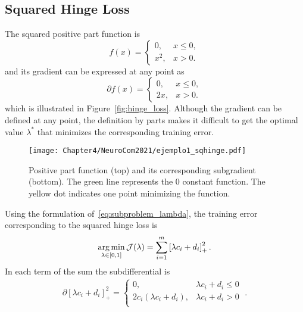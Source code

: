 \subsection{Squared Hinge Loss}
The squared positive part function is
\begin{equation}
    \nonumber
    f(x) = 
    \begin{cases}
    0 ,& x \leq 0, \\
    x^2 ,& x > 0    .
    \end{cases}
\end{equation}
and its gradient can be expressed at any point as
\begin{equation}
    \nonumber
    \partial f(x) = 
    \begin{cases}
    0 ,& x \leq 0, \\
    2x ,& x > 0 .
    \end{cases}
\end{equation}
which is illustrated in Figure~\ref{fig:hinge_loss}.
Although the gradient can be defined at any point, the definition by parts makes it difficult to get the optimal value $\lambda^*$ that minimizes the corresponding training error.
\begin{figure}[t!]
    \centering
    \texttt{[image: Chapter4/NeuroCom2021/ejemplo1\_sqhinge.pdf]}
    \caption{Positive part function (top) and its corresponding subgradient (bottom). The green line represents the $0$ constant function. The yellow dot indicates one point minimizing the function.}
    \label{fig:sqhinge_loss}
\end{figure}
Using the formulation of~\eqref{eq:subproblem_lambda}, the training error corresponding to the squared hinge loss is
\begin{equation}
    \label{eq:opt_hinge_l2}
    \argmin_{\lambda \in [0, 1]} \mathcal{J}(\lambda) = \sum_{i=1}^{\npertask} \pospart{\lambda c_i + d_i}^2.
\end{equation}
In each term of the sum the subdifferential is 
\begin{equation}
    \label{eq:subdiff_hinge_l2}
    \begin{aligned}
        \partial \left[\lambda c_i + d_i \right]_+^2 = 
    \begin{cases}
        0 ,& \lambda c_i + d_i  \leq 0 \\
        2 c_i (\lambda c_i + d_i) ,& \lambda c_i + d_i  > 0 \\
    \end{cases} \; .
    \end{aligned}
\end{equation}
